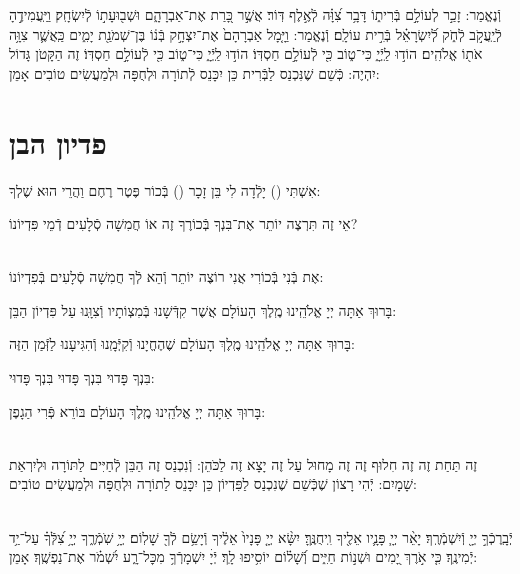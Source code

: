 \documentclass[twoside, openany, parskip=half, 11pt]{book}
\begin{document}

וְֿנֶאֱמַר: זָכַ֣ר לְעוֹלָ֣ם בְּֿרִית֑וֹ דָּבָ֥ר צִ֝וָּ֗ה לְֿאֶ֣לֶף דּֽוֹר׃ אֲשֶׁ֣ר כָּ֭רַת אֶת־אַבְרָהָ֑ם
וּשְׁב֖וּעָת֣וֹ לְֿיִשְׂחָֽק׃ וַיַּֽעֲמִידֶ֣הָ לְֿיַֽעֲקֹ֣ב לְֿחֹ֑ק לְֿ֝יִשְׂרָאֵ֗ל בְּֿרִ֣ית עוֹלָֽם׃
וְֿנֶאֱמַר: וַיָּ֤מָל אַבְרָהָם֙ אֶת־יִצְחָ֣ק בְּֿנ֔וֹ בֶּן־שְׁמֹנַ֖ת יָמִ֑ים כַּֽאֲשֶׁ֛ר צִוָּ֥ה אֹת֖וֹ אֱלֹהִֽים׃ הוֹד֣וּ לַֽיְֿיָ֑ כִּי־ט֑וֹב כִּ֖י לְֿעוֹלָ֣ם חַסְדּֽוֹ׃
הוֹד֣וּ לַֽיְֿיָ֑ כִּי־ט֑וֹב כִּ֖י לְֿעוֹלָ֣ם חַסְדּֽוֹ׃
 זֶה הַקָּטֹן גָּדוֹל יִהְיֶה:
כְּֿשֵׁם שֶׁנִּכְנַס לַבְּֿרִית כֵּן יִכָּנֵס לְֿתוֹרָה וּלְחֻפָּה וּלְמַעֲשִׂים טוֹבִים אָמֵן:

\vfill
\sepline

\chapter[פדיון הבן]{ פדיון הבן }


אִשְׁתִּי () יָלְֿדָה לִי בֵּן זָכָר () בְּֿכוֹר פֶּטֶר רֶחֶם וַהֲרֵי הוּא שֶׁלְךָ:

אֵי זֶה תִּרְצֶה יוֹתֵר אֶת־בִּנְךָ בְּֿכוֹרֶךָ זֶה אוֹ חֲמִשָׁה סְֿלָעִים דְֿמֵי פִּדְיוֹנוֹ?

\\
אֶת בְּֿנִי בְּֿכוֹרִי אֲנִי רוֹצֶה יוֹתֵר וְֿהֵא לְֿךָ חֲמִשָׁה סְֿלָעִים בְּֿפִדְיוֹנוֹ:

בָּרוּךְ אַתָּה יְיָ אֱלֹהֵֽינוּ מֶֽלֶךְ הָעוֹלָם אֲשֶׁר קִדְּֿשָׁנוּ בְּֿמִצְוֹתָיו וְֿצִוָּֽנוּ עַל פִּדְיוֹן הַבֵּן:

בָּרוּךְ אַתָּה יְיָ אֱלֹהֵֽינוּ מֶֽלֶךְ הָעוֹלָם שֶׁהֶחֱיָנוּ וְֿקִיְּֿמָֽנוּ וְֿהִגִּיעָנוּ לַזְּֿמַן הַזֶּה:


בִּנְךָ פָּדוּי בִּנְךָ פָּדוּי בִּנְךָ פָּדוּי:

בָּרוּךְ אַתָּה יְיָ אֱלֹהֵֽינוּ מֶֽלֶךְ הָעוֹלָם בּוֹרֵא פְּֿרִי הַגָפֶן:

 \\
זֶה תַּחַת זֶה זֶה חִלוּף זֶה זֶה מָחוּל עַל זֶה יָצָא זֶה לַכֹּהֵן:
וְֿנִכְנַס זֶה הַבֵּן לְֿחַיִּים לַתּוֹרָה וּלְיִרְאַת שָׁמָיִם:
יְֿהִי רָצוֹן שֶׁכְּֿשֵׁם שֶׁנִכְנַס לַפִּדְיוֹן כֵּן יִכָּנֵס לַתוֹרָה וּלְחֻפָּה וּלְמַעֲשִׂים טוֹבִים:

\\
יְֿבָֽרֶכְֿךָ֣ יְיָ֖ וְֿיִשְׁמְֿרֶֽךָ׃ יָאֵ֨ר יְיָ֧ פָּנָ֛יו אֵלֶ֖יךָ וִֽיחֻנֶּֽךָּ׃ יִשָּׂ֨א יְיָ֤ פָּנָיו֙ אֵלֶ֔יךָ וְֿיָשֵׂ֥ם לְֿךָ֖ שָׁלֽוֹם׃
יְיָ֥ שֹֽׁמְֿרֶ֑ךָ יְיָ֥ צִ֝לְּֿךָ֗ עַל־יַ֥ד יְֿמִינֶֽךָ׃
כִּ֤י אֹ֣רֶךְ יָ֭מִים וּשְׁנ֣וֹת חַיִּ֑ים וְֿ֝שָׁל֗וֹם יוֹסִ֥יפוּ לָֽךְ׃
יְֿיָׄ יִשְׁמָרְֿךָ֥ מִכׇּל־רָ֑ע יִ֝שְׁמֹ֗ר אֶת־נַפְשֶֽׁךָ׃ אָמֵן:
\end{document}
